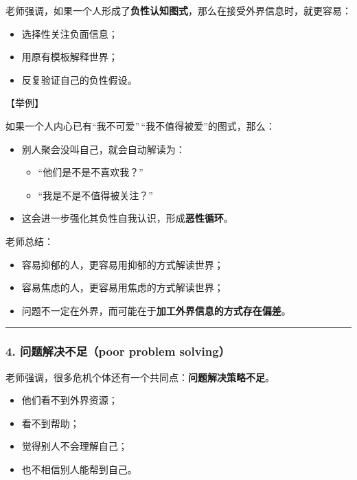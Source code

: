 \documentclass[
  chinese,
  9pt,
  a4paper,
]{ctexart}
\providecommand{\tightlist}{%
  \setlength{\itemsep}{0pt}\setlength{\parskip}{0pt}}
\begin{document}
老师强调，如果一个人形成了\textbf{负性认知图式}，那么在接受外界信息时，就更容易：

\begin{itemize}
\tightlist
\item
  选择性关注负面信息；
\item
  用原有模板解释世界；
\item
  反复验证自己的负性假设。
\end{itemize}

【举例】

如果一个人内心已有``我不可爱''\,``我不值得被爱''的图式，那么：

\begin{itemize}
\item
  别人聚会没叫自己，就会自动解读为：

  \begin{itemize}
  \tightlist
  \item
    ``他们是不是不喜欢我？''
  \item
    ``我是不是不值得被关注？''
  \end{itemize}
\item
  这会进一步强化其负性自我认识，形成\textbf{恶性循环}。
\end{itemize}

老师总结：

\begin{itemize}
\tightlist
\item
  容易抑郁的人，更容易用抑郁的方式解读世界；
\item
  容易焦虑的人，更容易用焦虑的方式解读世界；
\item
  问题不一定在外界，而可能在于\textbf{加工外界信息的方式存在偏差}。
\end{itemize}

\begin{center}\rule{0.5\linewidth}{0.5pt}\end{center}

\subsubsection{4. 问题解决不足（poor problem
solving）}\label{ux95eeux9898ux89e3ux51b3ux4e0dux8db3poor-problem-solving}

老师强调，很多危机个体还有一个共同点：\textbf{问题解决策略不足}。

\begin{itemize}
\tightlist
\item
  他们看不到外界资源；
\item
  看不到帮助；
\item
  觉得别人不会理解自己；
\item
  也不相信别人能帮到自己。
\end{itemize}
\end{document}
